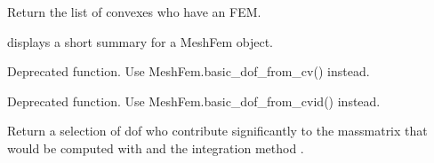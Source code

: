 \documentclass[a4paper,11pt,english]{sphinxmanual}
\begin{document}
\begin{fulllineitems}
\begin{fulllineitems}
\label{\detokenize{python/cmdref_MeshFem:getfem.MeshFem.convex_index}}
Return the list of convexes who have an FEM.

\end{fulllineitems}


\begin{fulllineitems}
\label{\detokenize{python/cmdref_MeshFem:getfem.MeshFem.display}}
displays a short summary for a MeshFem object.

\end{fulllineitems}


\begin{fulllineitems}
\label{\detokenize{python/cmdref_MeshFem:getfem.MeshFem.dof_from_cv}}
Deprecated function. Use MeshFem.basic\_dof\_from\_cv() instead.

\end{fulllineitems}


\begin{fulllineitems}
\label{\detokenize{python/cmdref_MeshFem:getfem.MeshFem.dof_from_cvid}}
Deprecated function. Use MeshFem.basic\_dof\_from\_cvid() instead.

\end{fulllineitems}


\begin{fulllineitems}
\label{\detokenize{python/cmdref_MeshFem:getfem.MeshFem.dof_from_im}}
Return a selection of dof who contribute significantly to the
mass\sphinxhyphen{}matrix that would be computed with  and the integration
method .


\end{fulllineitems}
\end{fulllineitems}
\end{document}
